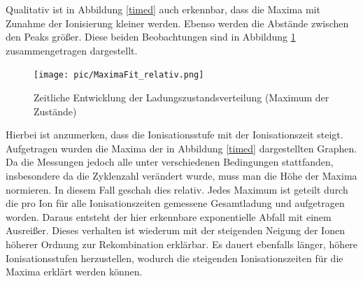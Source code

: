         Qualitativ ist in Abbildung \ref{timed} auch erkennbar, dass die Maxima mit Zunahme der Ionisierung kleiner werden. Ebenso werden die Abstände zwischen den Peaks größer. Diese beiden Beobachtungen sind in Abbildung \ref{maxrel} zusammengetragen dargestellt.\\
        \begin{figure}
            \texttt{[image: pic/MaximaFit\_relativ.png]}
            \caption{Zeitliche Entwicklung der Ladungszustandsverteilung (Maximum der Zustände)}
            \label{maxrel}
        \end{figure} 
        Hierbei ist anzumerken, dass die Ionisationsstufe mit der Ionisationszeit steigt. Aufgetragen wurden die Maxima der in Abbildung \ref{timed} dargestellten Graphen. Da die Messungen jedoch alle unter verschiedenen Bedingungen stattfanden, insbesondere da die Zyklenzahl verändert wurde, muss man die Höhe der Maxima normieren. In diesem Fall geschah dies relativ. Jedes Maximum ist geteilt durch die pro Ion für alle Ionisationszeiten gemessene Gesamtladung und aufgetragen worden. Daraus entsteht der hier erkennbare exponentielle Abfall mit einem Ausreißer.
        Dieses verhalten ist wiederum mit der steigenden Neigung der Ionen höherer Ordnung zur Rekombination erklärbar. Es dauert ebenfalls länger, höhere Ionisationsstufen herzustellen, wodurch die steigenden Ionisationszeiten für die Maxima erklärt werden können. 
        
        